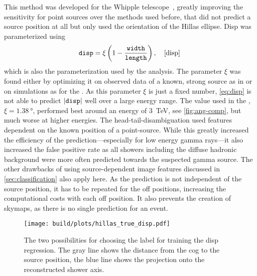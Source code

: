 This method was developed for the Whipple telescope~\cite{disp}, greatly improving
the sensitivity for point sources over the methods used before, that did not predict
a source position at all but only used the orientation of the Hillas ellipse.
Disp was parameterized using
\begin{equation}
  \param{disp} = \xi \left(1 - \frac{\param{width}}{\param{length}}\right), \quad \text{\cite[(7)]{disp}}\label{eq:disp}
\end{equation}
which is also the parameterization used by the \facttools{} analysis.
The parameter $\xi$ was found either by optimizing it on observed data of a known, 
strong source as in \cite{disp} or on simulations as for the \facttools{}.
As this parameter $\xi$ is just a fixed number, \eqref{eq:disp} is not able
to predict $\vert\mathtt{disp}\vert$ well over a large energy range.
The value used in the \facttools{}, $\xi = \SI{1.38}{\degree}$, performed best
around an energy of \SI{3}{\TeV}, see \autoref{fig:ang-comp}, but much worse at higher energies.
The \facttools{} head-tail-disambiguation used features dependent on the known position
of a point-source. 
While this greatly increased the efficiency of the prediction—especially for low energy
gamma rays—it also increased the false positive rate as all showers including
the diffuse hadronic background were more often predicted towards the suspected gamma source.
The other drawbacks of using source-dependent image features discussed in \autoref{sec:classification} also apply here.
As the prediction is not independent of the source position, it has to be repeated for
the off positions, increasing the computational costs with each off position.
It also prevents the creation of skymaps, as there is no single prediction 
for an event.

\begin{figure}
  \centering
  \texttt{[image: build/plots/hillas\_true\_disp.pdf]}
  \caption{%
    The two possibilities for choosing the label for training the disp regression.
    The gray line shows the distance from the cog to the source position, the
    blue line shows the projection onto the reconstructed shower axis.
  }\label{fig:true-disp}
\end{figure}

